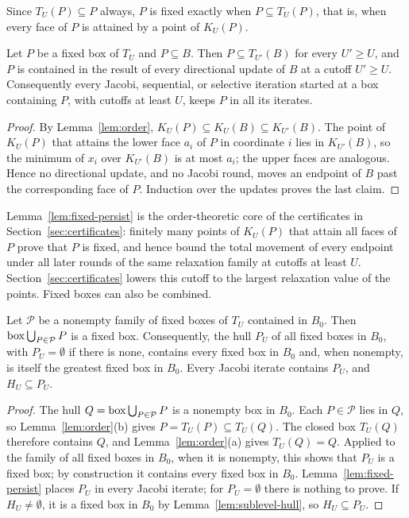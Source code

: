 Since $T_U(P)\subseteq P$ always, $P$ is fixed exactly when
$P\subseteq T_U(P)$, that is, when every face of $P$ is attained by a point
of $K_U(P)$.

\begin{lemma}\label{lem:fixed-persist}
Let $P$ be a fixed box of $T_U$ and $P\subseteq B$. Then $P\subseteq T_{U'}(B)$
for every $U'\ge U$, and $P$ is contained in the result of every
directional update of $B$ at a cutoff $U'\ge U$. Consequently every Jacobi,
sequential, or selective iteration started at a box containing $P$, with
cutoffs at least $U$, keeps $P$ in all its iterates.
\end{lemma}

\begin{proof}
By Lemma~\ref{lem:order}, $K_U(P)\subseteq K_U(B)\subseteq K_{U'}(B)$. The
point of $K_U(P)$ that attains the lower face $a_i$ of $P$ in coordinate $i$
lies in $K_{U'}(B)$, so the minimum of $x_i$ over $K_{U'}(B)$ is at most
$a_i$; the upper faces are analogous. Hence no directional update, and no
Jacobi round, moves an endpoint of $B$ past the corresponding face of $P$.
Induction over the updates proves the last claim.
\end{proof}

Lemma~\ref{lem:fixed-persist} is the order-theoretic core of the
certificates in Section~\ref{sec:certificates}: finitely many points of
$K_U(P)$ that attain all faces of $P$ prove that $P$ is fixed, and hence
bound the total movement of every endpoint under all later rounds of the
same relaxation family at cutoffs at least $U$.
Section~\ref{sec:certificates} lowers this cutoff to the largest relaxation
value of the points. Fixed boxes can also be combined.

\begin{lemma}\label{lem:greatest-fixed}
Let $\mathcal P$ be a nonempty family of fixed boxes of $T_U$ contained in
$B_0$. Then $\operatorname{box}\bigcup_{P\in\mathcal P}P$ is a fixed box. Consequently,
the hull $P_U$ of all fixed boxes in $B_0$, with $P_U=\emptyset$ if there is
none, contains every fixed box in $B_0$ and, when nonempty, is itself the
greatest fixed box in $B_0$. Every Jacobi iterate contains $P_U$, and
$H_U\subseteq P_U$.
\end{lemma}

\begin{proof}
The hull $Q=\operatorname{box}\bigcup_{P\in\mathcal P}P$ is a nonempty box in $B_0$. Each
$P\in\mathcal P$ lies in $Q$, so Lemma~\ref{lem:order}(b) gives
$P=T_U(P)\subseteq T_U(Q)$. The closed box $T_U(Q)$ therefore contains $Q$,
and Lemma~\ref{lem:order}(a) gives $T_U(Q)=Q$. Applied to the family of all
fixed boxes in $B_0$, when it is nonempty, this shows that $P_U$ is a fixed
box; by construction it contains every fixed box in $B_0$.
Lemma~\ref{lem:fixed-persist} places $P_U$ in every Jacobi iterate; for
$P_U=\emptyset$ there is nothing to prove. If $H_U\ne\emptyset$, it is a
fixed box in $B_0$ by Lemma~\ref{lem:sublevel-hull}, so $H_U\subseteq P_U$.
\end{proof}

